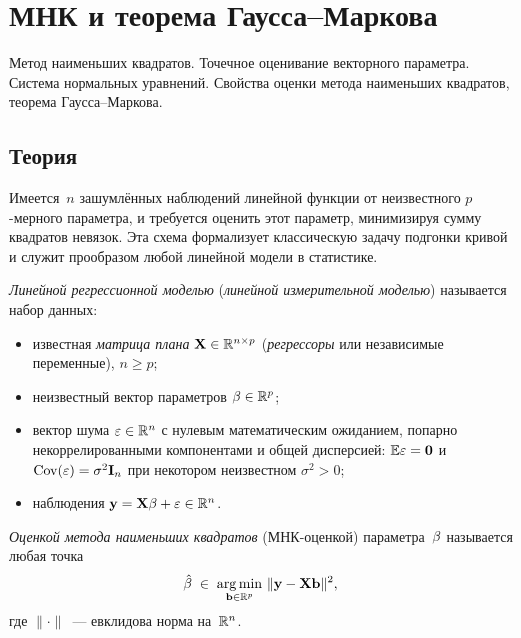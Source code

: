 
\section{МНК и теорема Гаусса–Маркова}
\label{sec:1.2.11-least-squares-gauss-markov}

\begin{ticket}
Метод наименьших квадратов. Точечное оценивание векторного параметра. Система нормальных уравнений. Свойства оценки метода наименьших квадратов, теорема Гаусса–Маркова.
\end{ticket}

\subsection*{Теория}

Имеется~$n$ зашумлённых наблюдений линейной функции от неизвестного $p$-мерного параметра, и требуется оценить этот параметр, минимизируя сумму квадратов невязок. Эта схема формализует классическую задачу подгонки кривой и служит прообразом любой линейной модели в статистике.

\begin{definition}
\label{def:linear-regression-model}
\emph{Линейной регрессионной моделью} (\emph{линейной измерительной моделью}) называется набор данных:
\begin{itemize}
  \item известная \emph{матрица плана} $\mathbf{X} \in \mathbb{R}^{n \times p}$ (\emph{регрессоры} или независимые переменные), $n \geq p$;
  \item неизвестный вектор параметров $\mathbf{\beta} \in \mathbb{R}^p$;
  \item вектор шума $\mathbf{\varepsilon} \in \mathbb{R}^n$ с нулевым математическим ожиданием, попарно некоррелированными компонентами и общей дисперсией: $\mathbb{E} \mathbf{\varepsilon} = \mathbf{0}$ и $\operatorname{Cov}(\mathbf{\varepsilon}) = \sigma^2 \mathbf{I}_n$ при некотором неизвестном $\sigma^2 > 0$;
  \item наблюдения $\mathbf{y} = \mathbf{X} \mathbf{\beta} + \mathbf{\varepsilon} \in \mathbb{R}^n$.
\end{itemize}
\end{definition}

\begin{definition}
\label{def:ols-estimator}
\emph{Оценкой метода наименьших квадратов} (МНК-оценкой) параметра~$\mathbf{\beta}$ называется любая точка
\[
  \hat{\mathbf{\beta}} \;\in\; \operatorname*{arg\,min}_{\mathbf{b} \in \mathbb{R}^p}\, \|\mathbf{y} - \mathbf{X} \mathbf{b}\|^2,
\]
где $\|\cdot\|$~--- евклидова норма на~$\mathbb{R}^n$.
\end{definition}

